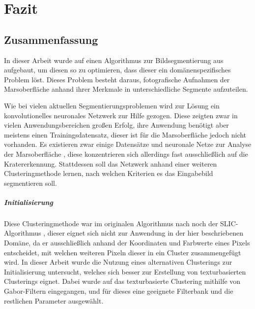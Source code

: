 \chapter{Fazit}
\label{chap:fazit}

\section{Zusammenfassung}

In dieser Arbeit wurde auf einen Algorithmus zur Bildsegmentierung aus \cite{kanezaki_18} aufgebaut, um diesen so zu optimieren, dass dieser ein domänenspezifisches Problem löst. Dieses Problem besteht daraus, fotografische Aufnahmen der Marsoberfläche anhand ihrer Merkmale in unterschiedliche Segmente aufzuteilen.

Wie bei vielen aktuellen Segmentierungsproblemen wird zur Lösung ein konvolutionelles neuronales Netzwerk zur Hilfe gezogen. Diese zeigten zwar in vielen Anwendungsbereichen großen Erfolg, ihre Anwendung benötigt aber meistens einen Trainingsdatensatz, dieser ist für die Marsoberfläche jedoch nicht vorhanden. Es existieren zwar einige Datensätze und neuronale Netze zur Analyse der Marsoberfläche \cite{cohen_16}, diese konzentrieren sich allerdings fast ausschließlich auf die Kratererkennung. Stattdessen soll das Netzwerk anhand einer weiteren Clusteringmethode lernen, nach welchen Kriterien es das Eingabebild segmentieren soll.

\paragraph{Initialisierung} Diese Clusteringmethode war im originalen Algorithmus nach \cite{kanezaki_18} noch der SLIC-Algorithmus \cite{achanta_10}, dieser eignet sich nicht zur Anwendung in der hier beschriebenen Domäne, da er ausschließlich anhand der Koordinaten und Farbwerte eines Pixels entscheidet, mit welchen weiteren Pixeln dieser in ein Cluster zusammengefügt wird. In dieser Arbeit wurde die Nutzung eines alternativen Clusterings zur Initialisierung untersucht, welches sich besser zur Erstellung von texturbasierten Clusterings eignet. Dabei wurde auf das texturbasierte Clustering mithilfe von Gabor-Filtern \cite{jain_91} eingegangen, und für dieses eine geeignete Filterbank und die restlichen Parameter ausgewählt.

